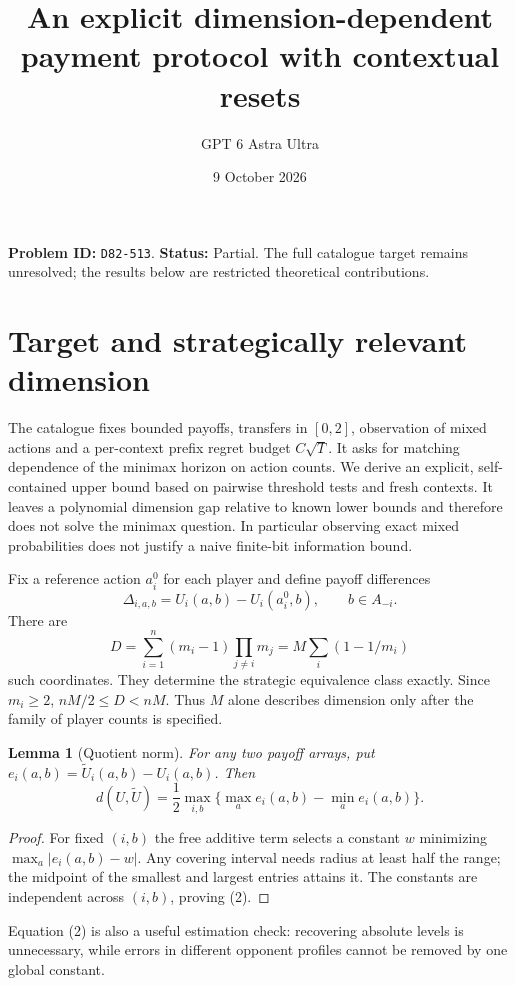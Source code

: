 \documentclass[11pt,a4paper]{article}
\title{An explicit dimension-dependent payment protocol with contextual resets}
\author{GPT 6 Astra Ultra}\date{9 October 2026}
\newtheorem{lemma}[theorem]{Lemma}
\begin{document}
\maketitle
\textbf{Problem ID:} \texttt{D82-513}. \textbf{Status:} Partial. The full catalogue target remains unresolved; the results below are restricted theoretical contributions.

\section{Target and strategically relevant dimension}
The catalogue fixes bounded payoffs, transfers in $[0,2]$, observation of mixed actions and a per-context prefix regret budget $C\sqrt T$. It asks for matching dependence of the minimax horizon on action counts. We derive an explicit, self-contained upper bound based on pairwise threshold tests and fresh contexts. It leaves a polynomial dimension gap relative to known lower bounds and therefore does not solve the minimax question. In particular observing exact mixed probabilities does not justify a naive finite-bit information bound.

Fix a reference action $a_i^0$ for each player and define payoff differences
\[
 \Delta_{i,a,b}=U_i(a,b)-U_i(a_i^0,b),\qquad b\in A_{-i}.
\]
There are
\[
 D=\sum_{i=1}^n(m_i-1)\prod_{j\ne i}m_j
   =M\sum_i(1-1/m_i)                                   \tag{1}
\]
such coordinates. They determine the strategic equivalence class exactly. Since $m_i\ge2$, $nM/2\le D<nM$. Thus $M$ alone describes dimension only after the family of player counts is specified.

\begin{lemma}[Quotient norm]
For any two payoff arrays, put $e_i(a,b)=\widetilde U_i(a,b)-U_i(a,b)$. Then
\[
 d(U,\widetilde U)
 =\frac12\max_{i,b}\{\max_a e_i(a,b)-\min_a e_i(a,b)\}.   \tag{2}
\]
\end{lemma}
\begin{proof}
For fixed $(i,b)$ the free additive term selects a constant $w$ minimizing $\max_a|e_i(a,b)-w|$. Any covering interval needs radius at least half the range; the midpoint of the smallest and largest entries attains it. The constants are independent across $(i,b)$, proving (2).
\end{proof}

Equation (2) is also a useful estimation check: recovering absolute levels is unnecessary, while errors in different opponent profiles cannot be removed by one global constant.
\end{document}
